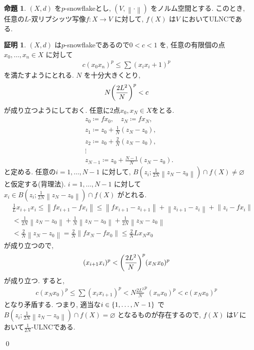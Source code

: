 \documentclass[10pt, fleqn, label-section=none]{bxjsarticle}
\theoremstyle{definition}
\newtheorem{prop}[dfn]{命題}
\newtheorem*{pf*}{証明}
\newcommand{\paren}[1]{\mleft( #1\mright )}
\newcommand{\cbra}[1]{\mleft\{#1\mright\}}
\newcommand{\norm}[1]{\left\|#1\right\|}
\renewcommand{\;}{\, ; \,}
\begin{document}
\begin{prop}$(X, d)$ を$p$-snowflakeとし, $(V, \norm \cdot)$ をノルム空間とする. このとき, 任意の$L$-双リプシッツ写像$f: X \rightarrow V$ に対して, $f(X)$ は$V$ においてULNCである.  

\end{prop}
\begin{pf*}$(X, d)$ は$p$-snowflakeであるので$ 0 < c < 1$ を, 任意の有限個の点$x_0, \ldots , x_n \in X$ に対して
\begin{align*} c(x_0 x_n)^ p \leq \sum(x_i x_i+1)^p\end{align*}
を満たすようにとれる. $N$ を十分大きくとり, 
\begin{align*} N \paren{\frac{2L^2}{N}}^p < c \end{align*}
が成り立つようにしておく. 任意に$2$点$x_0, x_N \in X$をとる. 
\begin{align*} &z_0 \coloneqq fx_0, \quad z_N \coloneqq fx_N, \\ &z_1 \coloneqq z_0 + \frac{1}{N} (z_N - z_0), \\&  z_2 \coloneqq z_0 + \frac{2}{N} (z_N - z_0)  , \\& \vdots   \\&    z_{N-1} \coloneqq z_0 + \frac{N-1}{N} (z_N - z_0)  .                               \end{align*}
と定める. 任意の$i = 1, \ldots , N-1$ に対して, $B(z_i ; \frac{1}{2N} \norm{z_N - z_0}) \cap f(X) \neq \varnothing$ と仮定する(背理法). $i = 1, \ldots , N-1$ に対して$x_i \in B(z_i ; \frac{1}{2N} \norm{z_N - z_0}) \cap f(X)$ がとれる. 
\begin{align*} &\frac{1}{L} x_{i + 1} x_i \leq \norm{fx_{i+ 1} - fx_{i} } \leq \norm{fx_{i+1} - z_{i+1}} + \norm{z_{i + 1} - z_i} + \norm{z_i - fx_i} \\&< \frac{1}{2N} \norm{z_N - z_0} + \frac{1}{N} \norm{z_N - z_0} + \frac{1}{2N} \norm{z_N - z_0} \\&< \frac{2}{N} \norm{z_N - z_0} = \frac{2}{N} \norm{fx_N - fx_0} \leq \frac{2}{N} L x_Nx_0 \end{align*}
が成り立つので, 
\begin{align*} (x_{i +1} x_i) ^p < \paren{ \frac{2L^2}{N}}^p (x_N x_0)^p \end{align*}
が成り立つ. すると, 
\begin{align*} c(x_N x_0)^ p \leq \sum (x_i x_{i+1}) ^p < N \frac{2 L^2}{N}^p (x_n x_0) ^p < c(x_N x_0) ^p \end{align*}
となり矛盾する. つまり, 適当な$i \in \cbra{1, \ldots , N-1}$ で $B(z_i ; \frac{1}{2N} \norm{z_N - z_0}) \cap f(X) = \varnothing$ となるものが存在するので, $f(X)$ は$V$ において$\frac{1}{2N}$-ULNCである. 

\qed
\end{pf*}
\end{document}
